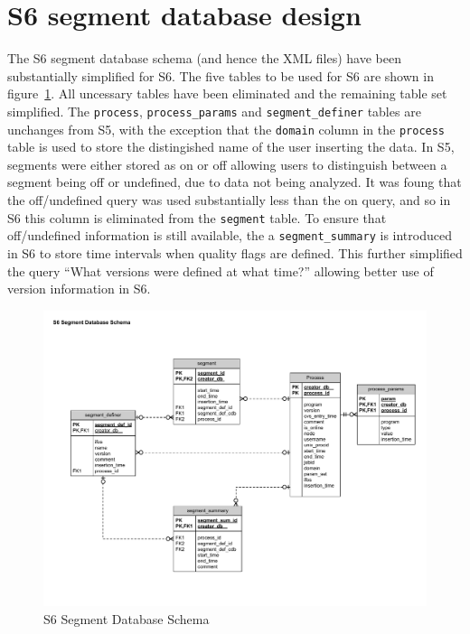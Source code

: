 \section{S6 segment database design}

The S6 segment database schema (and hence the XML files) have been
substantially simplified for S6.  The five tables to be used for S6 are shown
in figure~\ref{f:schema}. All uncessary tables have been eliminated and the
remaining table set simplified. The \verb|process|, \verb|process_params| and
\verb|segment_definer| tables are unchanges from S5, with the exception that
the \verb|domain| column in the \verb|process| table is used to store the
distingished name of the user inserting the data.  In S5, segments were either
stored as on or off allowing users to distinguish between a segment being off
or undefined, due to data not being analyzed. It was foung that the
off/undefined query was used substantially less than the on query, and so in
S6 this column is eliminated from the \verb|segment| table.  To ensure that
off/undefined information is still available, the a \verb|segment_summary| is
introduced in S6 to store time intervals when quality flags are defined. This
further simplified the query ``What versions were defined at what time?''
allowing better use of version information in S6.

\begin{figure}[h]
  \begin{center}
    \includegraphics[width=0.9\linewidth]{figures/segdb/T0900005_fig3}
  \end{center}
  \label{f:schema}
  \caption{S6 Segment Database Schema}
\end{figure}





